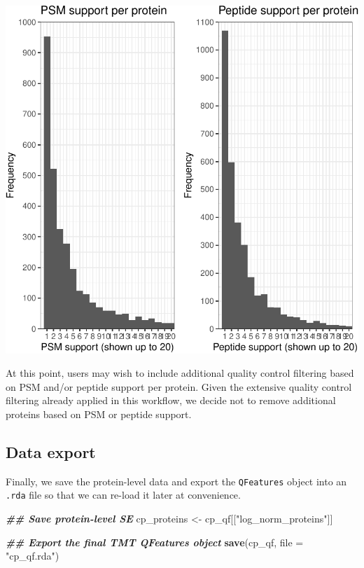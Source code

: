 \documentclass[9pt,a4paper,]{extarticle}
\newenvironment{Shaded}{\begin{snugshade}}{\end{snugshade}}
\newcommand{\AttributeTok}[1]{\textcolor[rgb]{0.13,0.29,0.53}{#1}}
\newcommand{\DocumentationTok}[1]{\textcolor[rgb]{0.56,0.35,0.01}{\textbf{\textit{#1}}}}
\newcommand{\FunctionTok}[1]{\textcolor[rgb]{0.13,0.29,0.53}{\textbf{#1}}}
\newcommand{\NormalTok}[1]{#1}
\newcommand{\OtherTok}[1]{\textcolor[rgb]{0.56,0.35,0.01}{#1}}
\newcommand{\StringTok}[1]{\textcolor[rgb]{0.31,0.60,0.02}{#1}}
\begin{document}
\begin{center}\includegraphics[width=1\linewidth]{workflow_expressions_files/figure-latex/support_plots-1} \end{center}

At this point, users may wish to include additional quality control filtering
based on PSM and/or peptide support per protein. Given the extensive quality
control filtering already applied in this workflow, we decide not to remove
additional proteins based on PSM or peptide support.

\hypertarget{data-export}{%
\subsection{Data export}\label{data-export}}

Finally, we save the protein-level data and export the \texttt{QFeatures} object into
an \texttt{.rda} file so that we can re-load it later at convenience.

\begin{Shaded}
\begin{Highlighting}[]
\DocumentationTok{\#\# Save protein{-}level SE}
\NormalTok{cp\_proteins }\OtherTok{\textless{}{-}}\NormalTok{ cp\_qf[[}\StringTok{"log\_norm\_proteins"}\NormalTok{]]}

\DocumentationTok{\#\# Export the final TMT QFeatures object}
\FunctionTok{save}\NormalTok{(cp\_qf, }\AttributeTok{file =} \StringTok{"cp\_qf.rda"}\NormalTok{)}
\end{Highlighting}
\end{Shaded}
\end{document}
